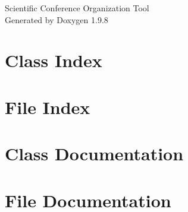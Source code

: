 \documentclass[twoside]{book}
\newcommand{\+}{\discretionary{\mbox{\scriptsize$\hookleftarrow$}}{}{}}
\newcommand{\clearemptydoublepage}{%
    \newpage{\pagestyle{empty}\cleardoublepage}%
  }
\begin{document}
  \raggedbottom
    \hypersetup{pageanchor=false,
                bookmarksnumbered=true,
                pdfencoding=unicode
               }
  \begin{titlepage}
  \vspace*{7cm}
  \begin{center}%
  {\Large Scientific Conference Organization Tool}\\
  \vspace*{1cm}
  {\large Generated by Doxygen 1.9.8}\\
  \end{center}
  \end{titlepage}
  \clearemptydoublepage
  \tableofcontents
  \clearemptydoublepage
  \hypersetup{pageanchor=true}
\chapter{Class Index}

\chapter{File Index}

\chapter{Class Documentation}









\chapter{File Documentation}











  \backmatter
  \newpage
  \clearemptydoublepage
  \printindex
\end{document}
